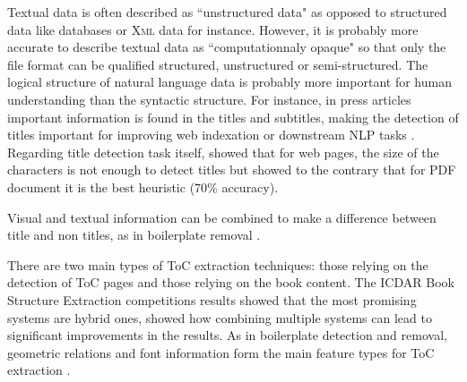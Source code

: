  Textual data is often described as  ``unstructured data" as opposed to structured data like databases or \textsc{Xml} data for instance. However, it is probably more accurate to describe textual data as ``computationnaly opaque" so that only the file format can be qualified structured, unstructured or semi-structured. 
  The logical structure of natural language data is probably more important for human understanding than the syntactic structure. For instance, in press articles important information is found in the titles and subtitles, making the detection of titles important for improving web indexation \cite{Changuel-2009} or downstream NLP tasks \cite{Huttunen-2011, Daille-2016,Tkaczyk-2018}.
  Regarding title detection task itself, \cite{Xue-2007} showed that for web pages, the size of the characters is not enough to detect titles but 
\cite{Beel-2013} showed to the contrary that for PDF document it is the best heuristic (70\% accuracy).

 Visual and textual information can be combined to make a difference between title and non titles, as in boilerplate removal \cite{Lejeune-2018, Alarte-2019}.
 

There are two main types of ToC extraction techniques: those relying on the detection of ToC pages and those relying on the book content. The ICDAR Book Structure Extraction competitions results \cite{Doucet-2013} showed that the most promising systems are hybrid ones,   \cite{Nguyen-2017} showed how combining multiple systems can lead to significant improvements in the results.
  As in boilerplate detection and removal, geometric relations and font information form the main feature types for ToC extraction \cite{Klampfl-2014}.  
 
